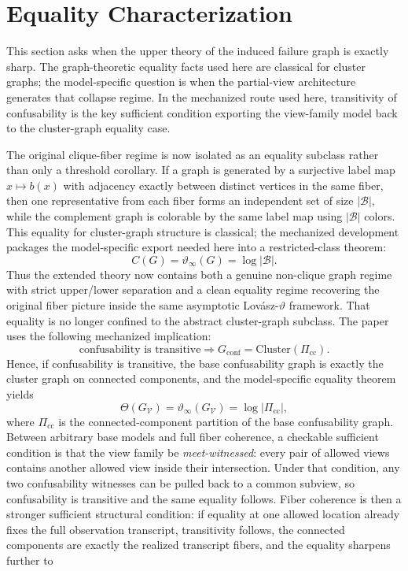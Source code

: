 \section{Equality Characterization}\label{sec:equality}


This section asks when the upper theory of the induced failure graph is exactly sharp. The graph-theoretic equality facts used here are classical for cluster graphs; the model-specific question is when the partial-view architecture generates that collapse regime. In the mechanized route used here, transitivity of confusability is the key sufficient condition exporting the view-family model back to the cluster-graph equality case.

The original clique-fiber regime is now isolated as an equality subclass rather than only a threshold corollary. If a graph is generated by a surjective label map $x \mapsto b(x)$ with adjacency exactly between distinct vertices in the same fiber, then one representative from each fiber forms an independent set of size $|\mathcal B|$, while the complement graph is colorable by the same label map using $|\mathcal B|$ colors. This equality for cluster-graph structure is classical; the mechanized development packages the model-specific export needed here into a restricted-class theorem:
\[
C(G)=\vartheta_{\infty}(G)=\log |\mathcal B|.
\]
Thus the extended theory now contains both a genuine non-clique graph regime with strict upper/lower separation and a clean equality regime recovering the original fiber picture inside the same asymptotic Lov\'asz-$\vartheta$ framework. That equality is no longer confined to the abstract cluster-graph subclass. The paper uses the following mechanized implication:
\[
\text{confusability is transitive}
\Longrightarrow
G_{\mathrm{conf}}=\mathrm{Cluster}(\Pi_{\mathrm{cc}}).
\]
Hence, if confusability is transitive, the base confusability graph is exactly the cluster graph on connected components, and the model-specific equality theorem yields
\[
\Theta(G_{\mathcal V})=\vartheta_\infty(G_{\mathcal V})=\log |\Pi_{\mathrm{cc}}|,
\]
where $\Pi_{\mathrm{cc}}$ is the connected-component partition of the base confusability graph. Between arbitrary base models and full fiber coherence, a checkable sufficient condition is that the view family be \emph{meet-witnessed}: every pair of allowed views contains another allowed view inside their intersection. Under that condition, any two confusability witnesses can be pulled back to a common subview, so confusability is transitive and the same equality follows. Fiber coherence is then a stronger sufficient structural condition: if equality at one allowed location already fixes the full observation transcript, transitivity follows, the connected components are exactly the realized transcript fibers, and the equality sharpens further to
